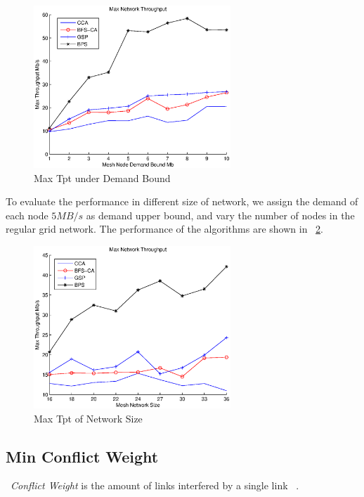 \begin{figure}
\centering
\includegraphics[width=74mm]{figures/maxtpt}
\vspace{-0.1in}
\caption{Max Tpt under Demand Bound}                                                                               
\label{fig:maxtpt}
\end{figure}

To evaluate the performance in different size of network, we assign the demand of each node $5MB/s$ as demand upper bound, and vary the number of nodes in the regular grid network. The performance of the algorithms are shown in ~\ref{fig:varysize}. 
\begin{figure}
\centering
\includegraphics[width=74mm]{figures/varysize}
\vspace{-0.1in}
\caption{Max Tpt of Network Size}                                                                               
\label{fig:varysize}
\end{figure}

\subsection{Min Conflict Weight}

~\emph{Conflict Weight} is the amount of links interfered by a single link ~\cite{JaPaPaQi03}. 









